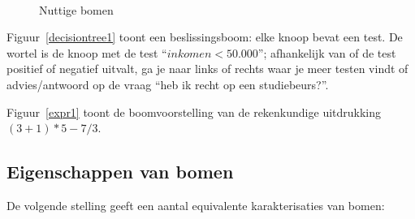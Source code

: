 \begin{figure}[ht]
\centering
\mbox{
{}}
\caption{Nuttige bomen}
\end{figure}


Figuur~\ref{decisiontree1} toont een beslissingsboom: elke knoop bevat
een test. De wortel is de knoop met de test ``$inkomen < 50.000$'';
afhankelijk van of de test positief of negatief uitvalt, ga je naar
links of rechts waar je meer testen vindt of advies/antwoord op de
vraag ``heb ik recht op een studiebeurs?''.

Figuur~\ref{expr1} toont de boomvoorstelling van de rekenkundige
uitdrukking $(3+1) *5 - 7/3$.

\subsection{Eigenschappen van bomen}

De volgende stelling geeft een aantal equivalente karakterisaties van
bomen:


